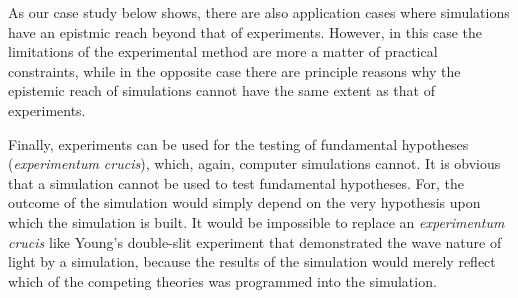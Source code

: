 \documentclass[12pt, a4paper]{article}
\numberwithin{equation}{section}
\begin{document}
  
As our case study below shows, there are also application cases where
simulations have an epistmic reach beyond that of experiments. However,
in this case the limitations of the experimental method are more a
matter of practical constraints, while in the opposite case there are
principle reasons why the epistemic reach of simulations cannot have the
same extent as that of experiments.
  
Finally, experiments can be used for the testing of fundamental
hypotheses ({\em experimentum crucis}), which, again, computer
simulations cannot. It is obvious that a simulation cannot be used to
test fundamental hypotheses. For, the outcome of the simulation would
simply depend on the very hypothesis upon which the simulation is built.
It would be impossible to replace an {\em experimentum crucis} like
Young's double-slit experiment that demonstrated the wave nature of
light 
by a simulation, because the results
of the simulation would merely reflect which of the competing theories
was programmed into the simulation.

\end{document}
